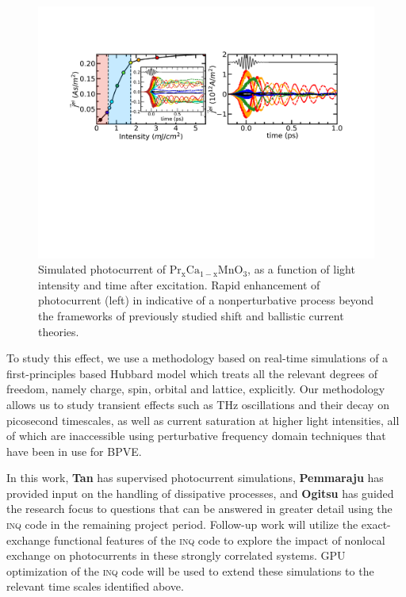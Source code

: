 \begin{figure}[ht]
	\centering\includegraphics[width=1.0\linewidth]{figures/photocurrent_old}
	\caption{
		Simulated photocurrent of \(\mathrm{Pr_xCa_{1-x}MnO_3}\), as a function of light intensity and time after excitation. 
		Rapid enhancement of photocurrent (left) in indicative of a nonperturbative process beyond the frameworks of previously studied shift and ballistic current theories.
	}
	\label{fig:PCMO}
\end{figure}

To study this effect, we use a methodology based on real-time simulations of a first-principles based Hubbard model which treats all the relevant degrees of freedom, namely charge, spin, orbital and lattice, explicitly. 
Our methodology allows us to study transient effects such as THz oscillations and their decay on picosecond timescales, as well as current saturation at higher light intensities, all of which are inaccessible using perturbative frequency domain techniques that have been in use for BPVE. 

In this work, {\bf Tan} has supervised photocurrent simulations, {\bf Pemmaraju} has provided input on the handling of dissipative processes, and {\bf Ogitsu} has guided the research focus to questions that can be answered in greater detail using the \textsc{inq} code in the remaining project period. 
Follow-up work will utilize the exact-exchange functional features of the \textsc{inq} code to explore the impact of nonlocal exchange on photocurrents in these strongly correlated systems. 
GPU optimization of the \textsc{inq} code will be used to extend these simulations to the relevant time scales identified above.  


